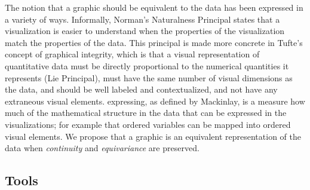 \documentclass[../main.tex]{subfiles}
\begin{document}
The notion that a graphic should be equivalent to the data has been expressed in a variety of ways. Informally, Norman's Naturalness Principal\cite{NaturalnessPrincipleInfoVis} states that a visualization is easier to understand when the properties of the visualization match the properties of the data. This principal is made more concrete in Tufte's concept of graphical integrity, which is that a visual representation of quantitative data must be directly proportional to the numerical quantities it represents (Lie Principal), must have the same number of visual dimensions as the data, and should be well labeled and contextualized, and not have any extraneous visual elements\cite{tufteVisualDisplayQuantitative2001}. expressing, as defined by Mackinlay, is a measure how much of the mathematical structure in the data that can be expressed in the visualizations; for example that ordered variables can be mapped into ordered visual elements. We propose that a graphic is an equivalent representation of the data when \textit{continuity} and \textit{equivariance} are preserved.



\subsection{Tools}
\label{sec:intro:data:tools}
\end{document}
